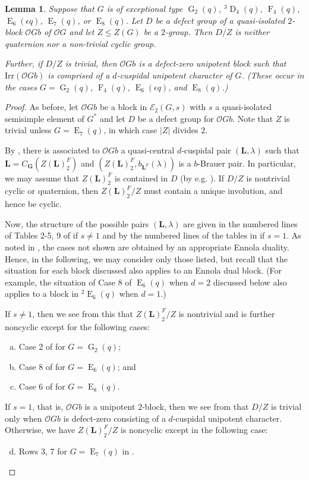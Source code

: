 \documentclass{amsart}
\theoremstyle{plain}\newtheorem{Theorem}{Theorem}[section]
\theoremstyle{plain}\newtheorem{Conjecture}[Theorem]{Conjecture}
\theoremstyle{plain}\newtheorem{Corollary}[Theorem]{Corollary}
\theoremstyle{plain}\newtheorem{Lemma}[Theorem]{Lemma}
\theoremstyle{plain}\newtheorem{Proposition}[Theorem]{Proposition}
\theoremstyle{definition}\newtheorem{Definition}[Theorem]{Definition}
\theoremstyle{definition}\newtheorem{Example}[Theorem]{Example}
\theoremstyle{definition}\newtheorem{Examples}[Theorem]{Examples}
\theoremstyle{definition}\newtheorem{Exercise}[Theorem]{Exercise}
\theoremstyle{definition}\newtheorem{Notation}[Theorem]{Notation}
\theoremstyle{definition}\newtheorem{Remark}[Theorem]{Remark}
\theoremstyle{definition}\newtheorem{Remarks}[Theorem]{Remarks}
\def\CO{{\mathcal{O}}}    \def\OPE{{\mathcal{O}(P\rtimes E)}}
\def\Irr{\mathrm{Irr}}           \def\tenK{\otimes_K}
\newcommand{\bG}{{\mathbf{G}}}
\newcommand{\bL}{{\mathbf{L}}}
\newcommand{\type}{\operatorname}
\newcommand{\tw}[1]{{}^#1\!}
\newcommand{\tD}{\type{D}}
\newcommand{\tE}{\type{E}}
\newcommand{\tF}{\type{F}}
\newcommand{\tG}{\type{G}}
\newcommand{\cent} {C}
\newcommand{\zent} {Z}
\numberwithin{equation}{section}
\begin{document}
\begin{Lemma}
    Suppose that $G$ is of exceptional type $\tG_2(q)$, $\tw{3}\tD_4(q)$, $\tF_4(q)$, $\tE_6(\epsilon q)$, $\tE_7(q)$, or $\tE_8(q)$. Let $D$ be a defect group of a quasi-isolated $2$-block $\CO G b$ of $\CO G$ and let $Z\leq \zent(G)$ be a $2$-group. Then $D/Z$ is neither quaternion nor a non-trivial cyclic group. 
    
    Further, if $D/Z$ is trivial, then $\CO G b$ is a defect-zero unipotent block such that $\Irr(\CO G b)$ is comprised of a $d$-cuspidal unipotent character of $G$. (These occur in the cases $G=\tG_2(q)$, $\tF_4(q)$, $\tE_6(\epsilon q)$, and $\tE_8(q)$.)
\end{Lemma}
\begin{proof}
As before, let $\CO G b$ be a block in $\mathcal{E}_2(G,s)$ with $s$ a quasi-isolated semisimple element of $G^\ast$ and let $D$ be a defect group for $\CO G b$. Note that $Z$ is trivial unless $G=\tE_7(q)$, in which case $|Z|$ divides $2$. 

By \cite[Thm.~7.12(d)]{KM13}, there is associated to $\CO G b$ a quasi-central $d$-cuspidal pair $(\bL, \lambda)$ such that $\bL=\cent_{\bG}(\zent(\bL)_2^F)$ and $(\zent(\bL)_2^F, b_{\bL^F}(\lambda))$ is a $b$-Brauer pair. In particular, we may assume that $\zent(\bL)_2^F$ is contained in $D$ (by e.g. \cite[Thm.~4.14]{N98}). If $D/Z$ is nontrivial cyclic or quaternion, then $\zent(\bL)_2^F/Z$ must contain a unique involution, and hence be cyclic.

Now, the structure of the possible pairs $(\bL, \lambda)$ are given in the numbered lines of Tables 2-5, 9 of \cite{KM13} if $s\neq 1$ and by the numbered lines of the tables in \cite[Sec.~3.2]{Eng00} if $s=1$. As noted in \cite{KM13, Eng00}, the cases not shown are obtained by an appropriate Ennola duality. Hence, in the following, we may consider only those listed, but recall that the situation for each block discussed also applies to an Ennola dual block. (For example, the situation of Case 8 of $\tE_6(q)$ when $d=2$ discussed below also applies to a block in $\tw{2}\tE_6(q)$ when $d=1$.)

If $s\neq 1$, then we see from this that $\zent(\bL)_2^F/Z$ is nontrivial and is further noncyclic except for the following cases:
\begin{enumerate}[(a)]
    \item Case 2 of \cite[Table 9]{KM13} for $G=\tG_2(q)$;
    \item Case 8 of \cite[Table 3]{KM13} for $G=\tE_6(q)$; and
    \item Case 6 of \cite[Table 5]{KM13} for $G=\tE_8(q)$.
\end{enumerate}
If $s=1$, that is, $\CO G b$ is a unipotent $2$-block, then we see from \cite[Sec.~3.2]{Eng00} that $D/Z$ is trivial only when $\CO G b$ is defect-zero consisting of a $d$-cuspidal unipotent character. Otherwise, we have $\zent(\bL)_2^F/Z$ is noncyclic except in the following case:
\begin{enumerate}[(a)]
\setcounter{enumi}{3}
\item Rows 3, 7 for $G=\tE_7(q)$ in \cite[Sec.~3.2]{Eng00}.
\end{enumerate}


\end{proof}
\end{document}
